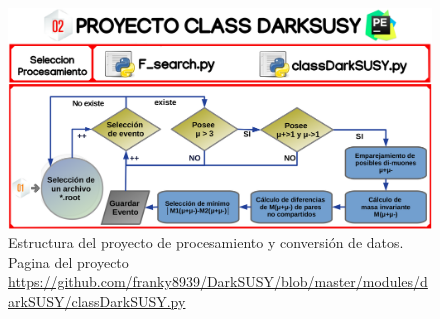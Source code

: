 \begin{figure}[ht]
\centering
\includegraphics[width=1\textwidth]{Simulacion/imagenes/class_darksusy.png}
\caption{Estructura del proyecto de procesamiento y conversión de datos. Pagina del proyecto \url{https://github.com/franky8939/DarkSUSY/blob/master/modules/darkSUSY/classDarkSUSY.py}}
\label{class_darksusy}
\end{figure}